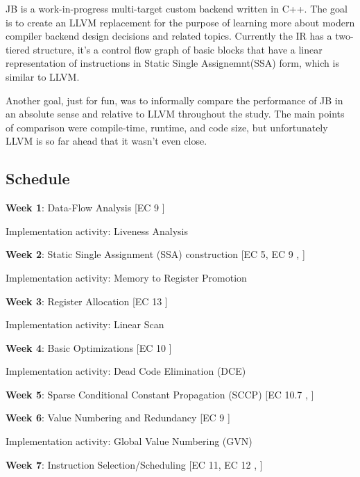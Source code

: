\documentclass[11pt, a4paper, titlepage]{article}
\begin{document}
JB is a work-in-progress multi-target custom backend written in C++.
The goal is to create an LLVM\cite{llvm} replacement for the purpose of learning more about modern compiler backend design decisions and related topics.
Currently the IR has a two-tiered structure, it's a control flow graph of basic blocks that have a linear representation of instructions in Static Single Assignemnt(SSA) form, which is similar to LLVM.

Another goal, just for fun, was to informally compare the performance of JB in an absolute sense and relative to LLVM throughout the study.
The main points of comparison were compile-time, runtime, and code size, but unfortunately LLVM is so far ahead that it wasn't even close.

\pagebreak
\subsection{Schedule}
\noindent \textbf{Week 1}: Data-Flow Analysis [EC 9 \cite{ec}]

\indent Implementation activity: Liveness Analysis
\vspace{0.1cm}

\noindent \textbf{Week 2}: Static Single Assignment (SSA) construction [EC 5, EC 9 \cite{ec}, \cite{ssa}]

\indent Implementation activity: Memory to Register Promotion
\vspace{0.1cm}

\noindent \textbf{Week 3}: Register Allocation [EC 13 \cite{ec}]

\indent Implementation activity: Linear Scan
\vspace{0.1cm}

\noindent \textbf{Week 4}: Basic Optimizations [EC 10 \cite{ec}]

\indent Implementation activity: Dead Code Elimination (DCE)
\vspace{0.1cm}

\noindent \textbf{Week 5}: Sparse Conditional Constant Propagation (SCCP) [EC 10.7 \cite{ec}, \cite{cprop}]
\vspace{0.1cm}

\noindent \textbf{Week 6}: Value Numbering and Redundancy [EC 9 \cite{ec}]

\indent Implementation activity: Global Value Numbering (GVN)
\vspace{0.1cm}

\noindent \textbf{Week 7}: Instruction Selection/Scheduling [EC 11, EC 12 \cite{ec}, \cite{llvmmeeting}]
\end{document}
